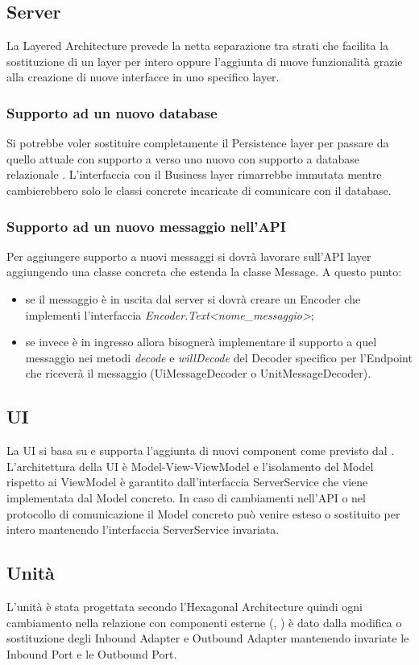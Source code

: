 \subsection{Server}
	La Layered Architecture prevede la netta separazione tra strati che facilita la sostituzione di un layer per intero oppure l'aggiunta di nuove funzionalità grazie alla creazione di nuove interfacce in uno specifico layer.
	\subsubsection{Supporto ad un nuovo database}
	Si potrebbe voler sostituire completamente il Persistence layer per passare da quello attuale con supporto a  verso uno nuovo con supporto a database relazionale . L'interfaccia con il Business layer rimarrebbe immutata mentre cambierebbero solo le classi concrete incaricate di comunicare con il database.
	\subsubsection{Supporto ad un nuovo messaggio nell'API}
	Per aggiungere supporto a nuovi messaggi si dovrà lavorare sull'API layer aggiungendo una classe concreta che estenda la classe Message. A questo punto:
	\begin{itemize}
		\item se il messaggio è in uscita dal server si dovrà creare un Encoder che implementi l'interfaccia \textit{Encoder.Text\textless nome\_messaggio\textgreater};
		\item se invece è in ingresso allora bisognerà implementare il supporto a quel messaggio nei metodi \textit{decode} e \textit{willDecode} del Decoder specifico per l'Endpoint che riceverà il messaggio (UiMessageDecoder o UnitMessageDecoder).
	\end{itemize}

\subsection{UI}
	La UI si basa su  e supporta l'aggiunta di nuovi component come previsto dal . L'architettura della UI è Model-View-ViewModel e l'isolamento del Model rispetto ai ViewModel è garantito dall'interfaccia ServerService che viene implementata dal Model concreto. In caso di cambiamenti nell'API o nel protocollo di comunicazione il Model concreto può venire esteso o sostituito per intero mantenendo l'interfaccia ServerService invariata.

\subsection{Unità}
	L'unità è stata progettata secondo l'Hexagonal Architecture quindi ogni cambiamento nella relazione con componenti esterne (, ) è dato dalla modifica o sostituzione degli Inbound Adapter e Outbound Adapter mantenendo invariate le Inbound Port e le Outbound Port.